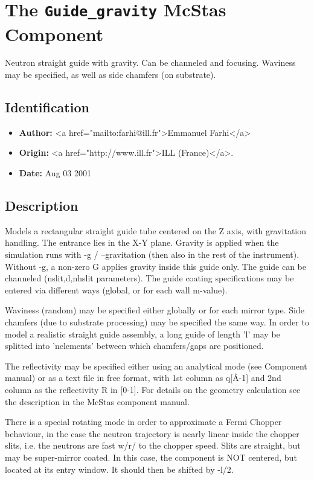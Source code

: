 \section{The \texttt{Guide\_gravity} McStas Component}
Neutron straight guide with gravity. Can be channeled and focusing.
Waviness may be specified, as well as side chamfers (on substrate).

\subsection*{Identification}
\begin{itemize}
  \item \textbf{Author:} \textless{}a href="mailto:farhi@ill.fr"\textgreater{}Emmanuel Farhi\textless{}/a\textgreater{}
  \item \textbf{Origin:} \textless{}a href="http://www.ill.fr"\textgreater{}ILL (France)\textless{}/a\textgreater{}.
  \item \textbf{Date:} Aug 03 2001
\end{itemize}

\subsection*{Description}
Models a rectangular straight guide tube centered on the Z axis, with gravitation handling. The entrance lies in the X-Y plane. Gravity is applied when the simulation runs with -g / --gravitation (then also in the rest of the instrument). Without -g, a non-zero G applies gravity inside this guide only. The guide can be channeled (nslit,d,nhslit parameters). The guide coating specifications may be entered via different ways (global, or for each wall m-value).

Waviness (random) may be specified either globally or for each mirror type. Side chamfers (due to substrate processing) may be specified the same way. In order to model a realistic straight guide assembly, a long guide of length 'l' may be splitted into 'nelements' between which chamfers/gaps are positioned.

The reflectivity may be specified either using an analytical mode (see Component manual) or as a text file in free format, with 1st column as q[\AA{}-1] and 2nd column as the reflectivity R in [0-1]. For details on the geometry calculation see the description in the McStas component manual.

There is a special rotating mode in order to approximate a Fermi Chopper behaviour, in the case the neutron trajectory is nearly linear inside the chopper slits, i.e. the neutrons are fast w/r/ to the chopper speed. Slits are straight, but may be super-mirror coated. In this case, the component is NOT centered, but located at its entry window. It should then be shifted by -l/2.

